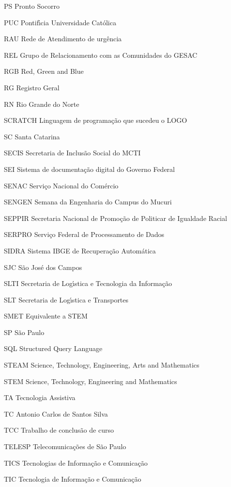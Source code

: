 \begin{siglas}
\item[PS] Pronto Socorro
\item[PUC] Pontif\'{\i}cia Universidade Cat\'olica
\item[RAU] Rede de Atendimento de urg\^encia
\item[REL] Grupo de Relacionamento com as Comunidades do GESAC
\item[RGB] Red, Green and Blue
\item[RG] Registro Geral
\item[RN] Rio Grande do Norte
\item[SCRATCH] Linguagem de programa\c{c}\~ao que sucedeu o LOGO
\item[SC] Santa Catarina
\item[SECIS] Secretaria de Inclus\~ao Social do MCTI
\item[SEI] Sistema de documenta\c{c}\~ao digital do Governo Federal
\item[SENAC] Servi\c{c}o Nacional do Com\'ercio
\item[SENGEN]  Semana da Engenharia do Campus do Mucuri
\item[SEPPIR] Secretaria Nacional de Promo\c{c}\~ao de Politicar de Igualdade Racial
\item[SERPRO] Servi\c{c}o Federal de Processamento de Dados
\item[SIDRA] Sistema IBGE de Recupera\c{c}\~ao Autom\'atica
\item[SJC] S\~ao Jos\'e dos Campos
\item[SLTI]  Secretaria de Log\'{\i}stica e Tecnologia da Informa\c{c}\~ao 
\item[SLT]  Secretaria de Log\'{\i}stica e Transportes
\item[SMET] Equivalente a STEM
\item[SP] S\~ao Paulo
\item[SQL] Structured Query Language
\item[STEAM] Science, Technology, Engineering, Arts and Mathematics
\item[STEM]  Science, Technology, Engineering and Mathematics
\item[TA] Tecnologia Assistiva
\item[TC] Antonio Carlos de Santos Silva
\item[TCC] Trabalho de conclus\~ao de curso
\item[TELESP] Telecomunica\c{c}\~oes de S\~ao Paulo
\item[TICS] Tecnologias de Informa\c{c}\~ao e Comunica\c{c}\~ao
\item[TIC] Tecnologia de Informa\c{c}\~ao e Comunica\c{c}\~ao

\end{siglas}
